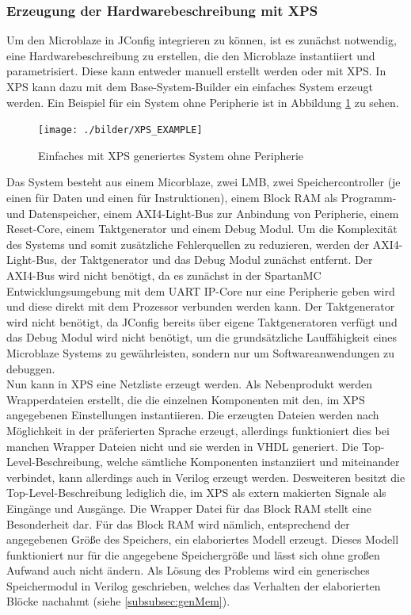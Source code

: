 \subsubsection{Erzeugung der Hardwarebeschreibung mit XPS}
Um den Microblaze in JConfig integrieren zu können, ist es zunächst notwendig, eine Hardwarebeschreibung zu erstellen, die den Microblaze instantiiert und parametrisiert.
Diese kann entweder manuell erstellt werden oder mit XPS. In XPS kann dazu mit dem Base-System-Builder ein einfaches System erzeugt werden. Ein Beispiel für ein System ohne Peripherie ist in Abbildung \ref{fig:XPS_EXAMPLE} zu sehen.
\begin{figure}[ht!]
\centering
\texttt{[image: ./bilder/XPS\_EXAMPLE]}
\caption{Einfaches mit XPS generiertes System ohne Peripherie}
\label{fig:XPS_EXAMPLE}
\end{figure}
Das System besteht aus einem Micorblaze, zwei LMB, zwei Speichercontroller (je einen für Daten und einen für Instruktionen), einem Block RAM als Programm- und Datenspeicher, einem AXI4-Light-Bus zur Anbindung von Peripherie, einem Reset-Core, einem Taktgenerator und einem Debug Modul. Um die Komplexität des Systems und somit zusätzliche Fehlerquellen zu reduzieren, werden der AXI4-Light-Bus, der Taktgenerator und das Debug Modul zunächst entfernt. Der AXI4-Bus wird nicht benötigt, da es zunächst in der SpartanMC Entwicklungsumgebung mit dem UART IP-Core nur eine Peripherie geben wird und diese direkt mit dem Prozessor verbunden werden kann. Der Taktgenerator wird nicht benötigt, da JConfig bereits über eigene Taktgeneratoren verfügt und das Debug Modul wird nicht benötigt, um die grundsätzliche Lauffähigkeit eines Microblaze Systems zu gewährleisten, sondern nur um Softwareanwendungen zu debuggen.\\
Nun kann in XPS eine Netzliste erzeugt werden. Als Nebenprodukt werden Wrapperdateien erstellt, die die einzelnen Komponenten mit den, im XPS angegebenen Einstellungen instantiieren. Die erzeugten Dateien werden nach Möglichkeit in der präferierten Sprache erzeugt, allerdings funktioniert dies bei manchen Wrapper Dateien nicht und sie werden in VHDL generiert. Die Top-Level-Beschreibung, welche sämtliche Komponenten instanziiert und miteinander verbindet, kann allerdings auch in Verilog erzeugt werden. Desweiteren besitzt die Top-Level-Beschreibung lediglich die, im XPS als extern makierten Signale als Eingänge und Ausgänge. Die Wrapper Datei für das Block RAM stellt eine Besonderheit dar. Für das Block RAM wird nämlich, entsprechend der angegebenen Größe des Speichers, ein elaboriertes Modell erzeugt. Dieses Modell funktioniert nur für die angegebene Speichergröße und lässt sich ohne großen Aufwand auch nicht ändern. Als Lösung des Problems wird ein generisches Speichermodul in Verilog geschrieben, welches das Verhalten der elaborierten Blöcke nachahmt (siehe \ref{subsubsec:genMem}).\\
